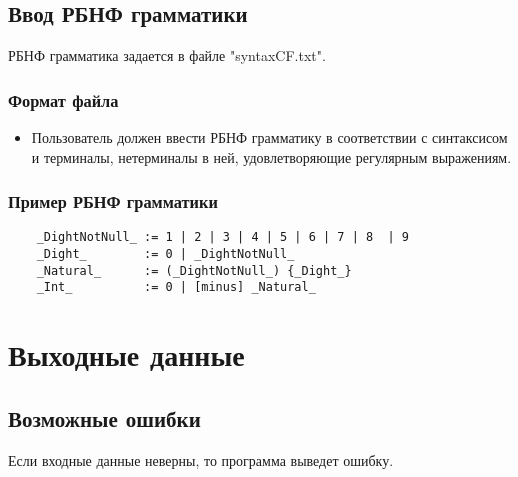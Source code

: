 \documentclass[12pt]{article}
\begin{document}


    \hfill
    \subsection{Ввод РБНФ грамматики}

    РБНФ грамматика задается в файле "syntaxCF.txt".

    \subsubsection*{Формат файла}
    \begin{itemize}
        \item Пользователь должен ввести РБНФ грамматику в соответствии с синтаксисом и терминалы, нетерминалы в ней, удовлетворяющие регулярным выражениям.
    \end{itemize}

    \subsubsection*{Пример РБНФ грамматики}
    \begin{lstlisting}
    _DightNotNull_ := 1 | 2 | 3 | 4 | 5 | 6 | 7 | 8  | 9
    _Dight_        := 0 | _DightNotNull_
    _Natural_      := (_DightNotNull_) {_Dight_}
    _Int_          := 0 | [minus] _Natural_
    \end{lstlisting}

    \clearpage


    \section{Выходные данные}

    \subsection{Возможные ошибки}

    Если входные данные неверны, то программа выведет ошибку.
\end{document}
